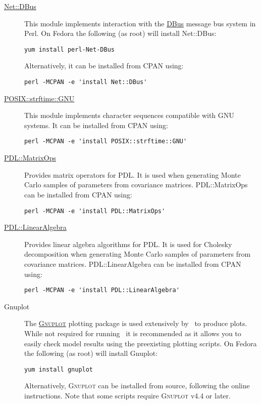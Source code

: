 \begin{description}
\item [\href{http://search.cpan.org/~danberr/Net-DBus-0.33.6/lib/Net/DBus.pm}{{\normalfont \ttfamily Net::DBus}}] This module implements interaction with the \href{http://www.freedesktop.org/wiki/Software/dbus}{DBus} message bus system in Perl. On Fedora the following (as root) will install {\normalfont \ttfamily Net::DBus}:
\begin{verbatim}
yum install perl-Net-DBus
\end{verbatim}
Alternatively, it can be installed from CPAN using:
\begin{verbatim}
perl -MCPAN -e 'install Net::DBus'
\end{verbatim}

\item [\href{http://search.cpan.org/~dexter/POSIX-strftime-GNU-0.02/lib/POSIX/strftime/GNU.pm}{{\normalfont \ttfamily POSIX::strftime::GNU}}] This module implements character sequences compatible with GNU systems. It can be installed from CPAN using:
\begin{verbatim}
perl -MCPAN -e 'install POSIX::strftime::GNU'
\end{verbatim}

  \item [\href{http://search.cpan.org/~chm/PDL-2.4.7/Basic/MatrixOps/matrixops.pd}{{\normalfont \ttfamily PDL::MatrixOps}}] Provides matrix operators for PDL. It is used when generating Monte Carlo samples of parameters from covariance matrices. {\normalfont \ttfamily PDL::MatrixOps} can be installed from CPAN using:
\begin{verbatim}
perl -MCPAN -e 'install PDL::MatrixOps'
\end{verbatim}
  \item [\href{http://search.cpan.org/~ellipse/PDL-LinearAlgebra-0.06/LinearAlgebra.pm}{{\normalfont \ttfamily PDL::LinearAlgebra}}] Provides linear algebra algorithms for PDL. It is used for Cholesky decomposition when generating Monte Carlo samples of parameters from covariance matrices. {\normalfont \ttfamily PDL::LinearAlgebra} can be installed from CPAN using:
\begin{verbatim}
perl -MCPAN -e 'install PDL::LinearAlgebra'
\end{verbatim}

\item[Gnuplot] The \href{http://www.gnuplot.info/}{\normalfont \scshape Gnuplot} plotting package is used extensively by \glc\ to produce plots. While not required for running \glc\ it is recommended as it allows you to easily check model results using the preexisting plotting scripts. On Fedora the following (as root) will install {\normalfont \ttfamily Gnuplot}:
\begin{verbatim}
yum install gnuplot
\end{verbatim}
Alternatively, {\normalfont \scshape Gnuplot} can be installed from source, following the online instructions. Note that some scripts require {\normalfont \scshape Gnuplot} v4.4 or later.


\end{description}
